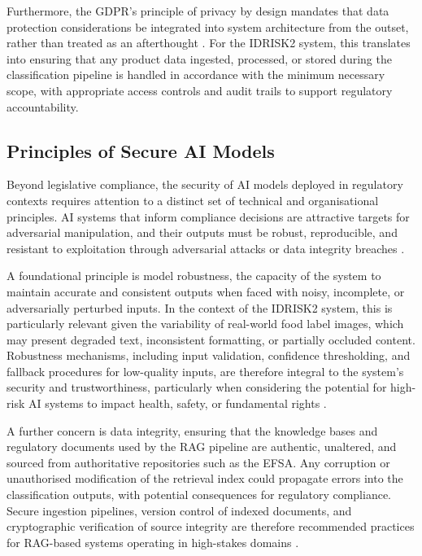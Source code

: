 Furthermore, the GDPR's principle of privacy by design mandates that data protection considerations be integrated into system architecture from the outset, rather than treated as an afterthought \parencite{jelena_schmidt_e77b64ec}. For the IDRISK2 system, this translates into ensuring that any product data ingested, processed, or stored during the classification pipeline is handled in accordance with the minimum necessary scope, with appropriate access controls and audit trails to support regulatory accountability.

\hypertarget{principles-of-secure-ai-models}{%
\subsection{Principles of Secure AI Models}\label{principles-of-secure-ai-models}}

Beyond legislative compliance, the security of AI models deployed in regulatory contexts requires attention to a distinct set of technical and organisational principles. AI systems that inform compliance decisions are attractive targets for adversarial manipulation, and their outputs must be robust, reproducible, and resistant to exploitation through adversarial attacks or data integrity breaches \parencite{dhruvitkumar_v__talati_5e1ce083}.

A foundational principle is model robustness, the capacity of the system to maintain accurate and consistent outputs when faced with noisy, incomplete, or adversarially perturbed inputs. In the context of the IDRISK2 system, this is particularly relevant given the variability of real-world food label images, which may present degraded text, inconsistent formatting, or partially occluded content. Robustness mechanisms, including input validation, confidence thresholding, and fallback procedures for low-quality inputs, are therefore integral to the system's security and trustworthiness, particularly when considering the potential for high-risk AI systems to impact health, safety, or fundamental rights \parencite{mateo_aboy_940b3b93}.

A further concern is data integrity, ensuring that the knowledge bases and regulatory documents used by the RAG pipeline are authentic, unaltered, and sourced from authoritative repositories such as the EFSA. Any corruption or unauthorised modification of the retrieval index could propagate errors into the classification outputs, with potential consequences for regulatory compliance. Secure ingestion pipelines, version control of indexed documents, and cryptographic verification of source integrity are therefore recommended practices for RAG-based systems operating in high-stakes domains \parencite{alex_dantart_273f7ed0,christoforus_yoga_haryanto_549a697c}.

